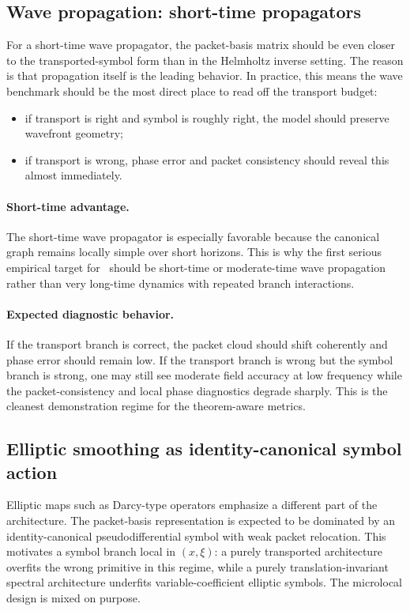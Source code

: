 \subsection{Wave propagation: short-time propagators}

For a short-time wave propagator, the packet-basis matrix should be even closer to the transported-symbol form than in the Helmholtz inverse setting. The reason is that propagation itself is the leading behavior. In practice, this means the wave benchmark should be the most direct place to read off the transport budget:
\begin{itemize}
\item if transport is right and symbol is roughly right, the model should preserve wavefront geometry;
\item if transport is wrong, phase error and packet consistency should reveal this almost immediately.
\end{itemize}

\paragraph{Short-time advantage.}
The short-time wave propagator is especially favorable because the canonical graph remains locally simple over short horizons. This is why the first serious empirical target for \MiNO\ should be short-time or moderate-time wave propagation rather than very long-time dynamics with repeated branch interactions.

\paragraph{Expected diagnostic behavior.}
If the transport branch is correct, the packet cloud should shift coherently and phase error should remain low. If the transport branch is wrong but the symbol branch is strong, one may still see moderate field accuracy at low frequency while the packet-consistency and local phase diagnostics degrade sharply. This is the cleanest demonstration regime for the theorem-aware metrics.

\subsection{Elliptic smoothing as identity-canonical symbol action}

Elliptic maps such as Darcy-type operators emphasize a different part of the architecture. The packet-basis representation is expected to be dominated by an identity-canonical pseudodifferential symbol with weak packet relocation. This motivates a symbol branch local in $(x,\xi)$: a purely transported architecture overfits the wrong primitive in this regime, while a purely translation-invariant spectral architecture underfits variable-coefficient elliptic symbols. The microlocal design is mixed on purpose.

